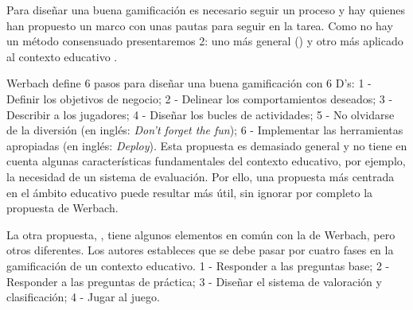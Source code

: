 Para diseñar una buena gamificación es necesario seguir un proceso y hay quienes han propuesto un marco con unas pautas para seguir en la tarea. 
%
Como no hay un método consensuado presentaremos 2: uno más general (\cite{werbach2012win}) y otro más aplicado al contexto educativo \cite{kapp2013gamification}.

Werbach define 6 pasos para diseñar una buena gamificación con 6 D's: 
1 - Definir los objetivos de negocio; 2 - Delinear los comportamientos deseados; 3 - Describir a los jugadores; 4 - Diseñar los bucles de actividades; 5 - No olvidarse de la diversión (en inglés: \textit{Don't forget the fun}); 6 - Implementar las herramientas apropiadas (en inglés: \textit{Deploy}).
%
Esta propuesta es demasiado general y no tiene en cuenta algunas características fundamentales del contexto educativo, por ejemplo, la necesidad de un sistema de evaluación.
%
Por ello, una propuesta más centrada en el ámbito educativo puede resultar más útil, sin ignorar por completo la propuesta de Werbach.

La otra propuesta, \cite{kapp2013gamification}, tiene algunos elementos en común con la de Werbach, pero otros diferentes. 
%
Los autores estableces que se debe pasar por cuatro fases en la gamificación de un contexto educativo. 1 - Responder a las preguntas base; 2 - Responder a las preguntas de práctica; 3 - Diseñar el sistema de valoración y clasificación; 4 - Jugar al juego.


